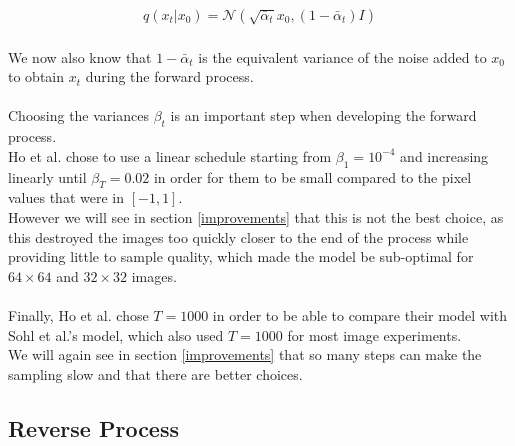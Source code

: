 \documentclass[twoside]{article}
\numberwithin{equation}{section}
\numberwithin{figure}{section}
\begin{document}
\begin{gather}
  q\left(x_t | x_0\right) = \mathcal{N}\left(\sqrt{\bar{\alpha}_t} x_0, \left(1 - \bar{\alpha}_t\right)I\right) \label{eq:quickforwardprocess}
\end{gather}
\\
We now also know that $1 - \bar{\alpha}_t$ is the equivalent variance of the noise added to $x_0$ to obtain $x_t$ during the forward process. \cite{nichol2021improved}
\\\\
Choosing the variances $\beta_t$ is an important step when developing the forward process. \\
Ho et al. \cite{ho2020denoising} chose to use a linear schedule starting from $\beta_1 = 10^{-4}$ and increasing linearly until $\beta_T = 0.02$ in order for them to be small compared to the pixel values that were in $\left[-1, 1\right]$. \cite{ho2020denoising} \\
However we will see in section \ref{improvements} that this is not the best choice, as this destroyed the images too quickly closer to the end of the process while providing little to sample quality, which made the model be sub-optimal for $64 \times 64$ and $32 \times 32$ images. \cite{nichol2021improved}
\\\\
Finally, Ho et al. \cite{ho2020denoising} chose $T = 1000$ in order to be able to compare their model with Sohl et al.'s \cite{sohldickstein2015deep} model, which also used $T = 1000$ for most image experiments. \\
We will again see in section \ref{improvements} that so many steps can make the sampling slow and that there are better choices. \cite{nichol2021improved}
\subsection{Reverse Process}
\end{document}
